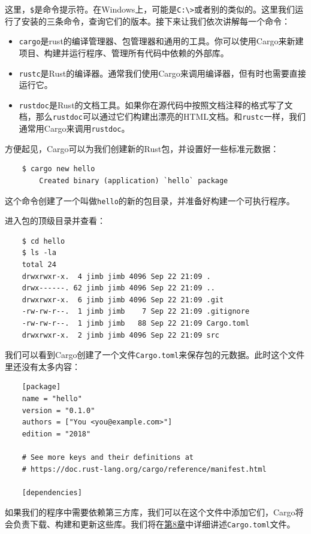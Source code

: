 这里，\texttt{\$}是命令提示符。在Windows上，可能是\texttt{C:\textbackslash>}或者别的类似的。这里我们运行了安装的三条命令，查询它们的版本。接下来让我们依次讲解每一个命令：
\begin{itemize}
    \item \texttt{cargo}是rust的编译管理器、包管理器和通用的工具。你可以使用Cargo来新建项目、构建并运行程序、管理所有代码中依赖的外部库。
    \item \texttt{rustc}是Rust的编译器。通常我们使用Cargo来调用编译器，但有时也需要直接运行它。
    \item \texttt{rustdoc}是Rust的文档工具。如果你在源代码中按照文档注释的格式写了文档，那么\texttt{rustdoc}可以通过它们构建出漂亮的HTML文档。和\texttt{rustc}一样，我们通常用Cargo来调用\texttt{rustdoc}。
\end{itemize}

方便起见，Cargo可以为我们创建新的Rust包，并设置好一些标准元数据：
\begin{verbatim}
    $ cargo new hello
        Created binary (application) `hello` package
\end{verbatim}

这个命令创建了一个叫做\texttt{hello}的新的包目录，并准备好构建一个可执行程序。

进入包的顶级目录并查看：
\begin{verbatim}
    $ cd hello
    $ ls -la
    total 24
    drwxrwxr-x.  4 jimb jimb 4096 Sep 22 21:09 .
    drwx------. 62 jimb jimb 4096 Sep 22 21:09 ..
    drwxrwxr-x.  6 jimb jimb 4096 Sep 22 21:09 .git
    -rw-rw-r--.  1 jimb jimb    7 Sep 22 21:09 .gitignore
    -rw-rw-r--.  1 jimb jimb   88 Sep 22 21:09 Cargo.toml
    drwxrwxr-x.  2 jimb jimb 4096 Sep 22 21:09 src
\end{verbatim}

我们可以看到Cargo创建了一个文件\texttt{Cargo.toml}来保存包的元数据。此时这个文件里还没有太多内容：
\begin{verbatim}
    [package]
    name = "hello"
    version = "0.1.0"
    authors = ["You <you@example.com>"]
    edition = "2018"

    # See more keys and their definitions at
    # https://doc.rust-lang.org/cargo/reference/manifest.html

    [dependencies]
\end{verbatim}

如果我们的程序中需要依赖第三方库，我们可以在这个文件中添加它们，Cargo将会负责下载、构建和更新这些库。我们将在\hyperref[ch08]{第8章}中详细讲述\texttt{Cargo.toml}文件。

